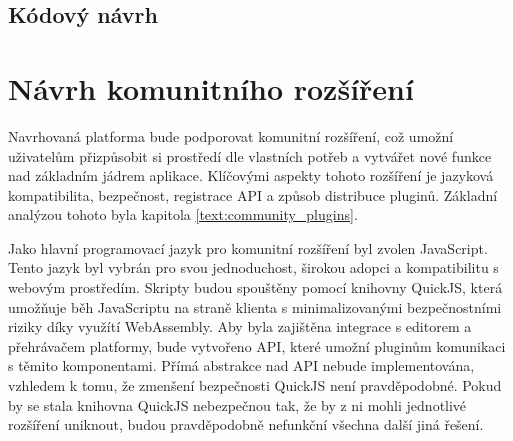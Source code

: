 \subsection{Kódový návrh}

    



\section{Návrh komunitního rozšíření}\label{text:navrh/plugins}

Navrhovaná platforma bude podporovat komunitní rozšíření, což umožní uživatelům přizpůsobit si prostředí dle vlastních potřeb a vytvářet nové funkce nad základním jádrem aplikace.
Klíčovými aspekty tohoto rozšíření je jazyková kompatibilita, bezpečnost, registrace API a způsob distribuce pluginů.
Základní analýzou tohoto byla kapitola \ref{text:community_plugins}.

Jako hlavní programovací jazyk pro komunitní rozšíření byl zvolen JavaScript.
Tento jazyk byl vybrán pro svou jednoduchost, širokou adopci a kompatibilitu s webovým prostředím.
Skripty budou spouštěny pomocí knihovny QuickJS, která umožňuje běh JavaScriptu na straně klienta s minimalizovanými bezpečnostními riziky díky využítí WebAssembly.
Aby byla zajištěna integrace s editorem a přehrávačem platformy, bude vytvořeno API, které umožní pluginům komunikaci s těmito komponentami. 
Přímá abstrakce nad API nebude implementována, vzhledem k tomu, že zmenšení bezpečnosti QuickJS není pravděpodobné.
Pokud by se stala knihovna QuickJS nebezpečnou tak, že by z ni mohli jednotlivé rozšíření uniknout, budou pravděpodobně nefunkční všechna další jiná řešení.

